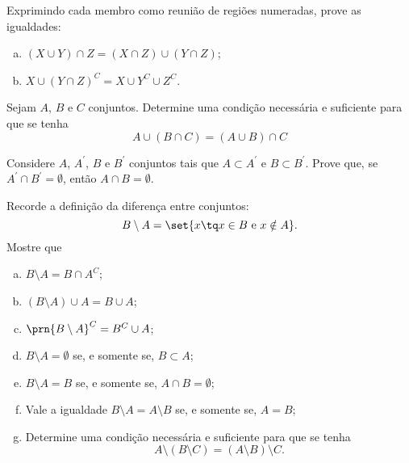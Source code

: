 \begin{exercise}
Exprimindo cada membro como reunião de regiões numeradas, prove
as igualdades:
\begin{enumerate}[a.]
  \item $\left(X \cup Y \right)\cap Z = \left(X \cap Z \right) \cup \left(Y \cap Z
  \right)$;
  \item $X \cup \left(Y \cap Z \right)^C = X \cup Y^C \cup Z^C$.
\end{enumerate}
\end{exercise}

\begin{exercise}
Sejam $A$, $B$ e $C$ conjuntos. Determine uma condição necessária e
suficiente para que se tenha 
	$$A \cup \left( B \cap C \right) = \left(A \cup B \right) \cap C$$
\end{exercise}

\begin{exercise}
Considere $A$, $A^\prime$, $B$ e $B^\prime$ conjuntos tais que $A  \subset A^\prime$ e 
$B \subset B^\prime$. Prove que, se $A^\prime \cap B^\prime=\emptyset$, então
$A\cap B = \emptyset$.  
\end{exercise}

\begin{exercise}
Recorde a definição da diferença entre conjuntos:
  $$B \setminus A = \set {x \tq x \in B \text { e } x \notin A}.$$
  Mostre que
    \begin{enumerate}[a.]
      \item $B \setminus A = B \cap A^C$;
      \item $(B \setminus A)\cup A = B \cup A$;
      \item $\prn{B \setminus A}^C = B^C\cup A$;
      \item $B \setminus A = \emptyset$ se, e somente se, $B \subset
      A$;
      \item $B \setminus A = B$ se, e somente se, $A \cap B =
      \emptyset$;
      \item Vale a igualdade $B \setminus A = A \setminus B$ se, e
      somente se, $A = B$;
      \item Determine uma condição necessária e suficiente para que
      se tenha $$A \setminus \left(B \setminus C \right) = \left(A
      \setminus B \right) \setminus C.$$
    \end{enumerate}
\end{exercise}

